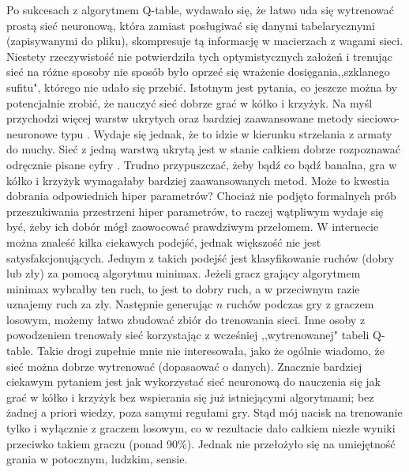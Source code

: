 \documentclass[licencjacka]{pracamgr}
\begin{document}
Po sukcesach z algorytmem Q-table, wydawało się, że łatwo uda się wytrenować prostą sieć neuronową, która zamiast posługiwać się danymi tabelarycznymi (zapisywanymi do pliku), skompresuje tą informację w macierzach z wagami sieci. Niestety rzeczywistość nie potwierdziła tych optymistycznych założeń i trenując sieć na różne sposoby nie sposób było oprzeć się wrażenie dosięgania,,szklanego sufitu", którego nie udało się przebić. Istotnym jest pytania, co jeszcze można by potencjalnie zrobić, że nauczyć sieć dobrze grać w kółko i krzyżyk.  Na myśl przychodzi więcej warstw ukrytych oraz bardziej zaawansowane metody  sieciowo-neuronowe  typu    . Wydaje się jednak, że to idzie w kierunku strzelania z armaty do muchy. Sieć z jedną warstwą ukrytą jest w stanie całkiem dobrze rozpoznawać odręcznie pisane cyfry \cite{nn}. Trudno przypuszczać, żeby bądź co bądź banalna, gra w kółko i krzyżyk wymagałaby bardziej zaawansowanych metod. Może to kwestia dobrania odpowiednich hiper parametrów? Chociaż nie podjęto formalnych  prób przeszukiwania przestrzeni hiper parametrów, to raczej wątpliwym wydaje się być, żeby ich dobór mógł zaowocować prawdziwym przełomem.  W internecie można znaleść kilka ciekawych podejść, jednak większość  nie jest satysfakcjonujących. Jednym z takich podejść jest klasyfikowanie ruchów (dobry lub zły) za pomocą algorytmu minimax. Jeżeli gracz grający algorytmem minimax wybrałby ten ruch, to jest to dobry ruch, a w przeciwnym razie uznajemy ruch za zły. Następnie generując $n$ ruchów podczas gry z graczem losowym, możemy łatwo zbudować zbiór do trenowania sieci. Inne osoby z powodzeniem trenowały sieć korzystając z wcześniej ,,wytrenowanej" tabeli Q-table.  Takie drogi zupełnie mnie nie interesowała, jako że ogólnie wiadomo, że sieć można dobrze wytrenować (dopasaować o danych). Znacznie bardziej ciekawym pytaniem jest jak wykorzystać sieć neuronową do nauczenia się  jak grać w kółko i krzyżyk bez wspierania się już istniejącymi algorytmami; bez żadnej a priori wiedzy, poza samymi regułami gry. Stąd mój nacisk na trenowanie tylko i wyłącznie z graczem losowym, co w rezultacie dało całkiem niezłe wyniki przeciwko takiem graczu (ponad 90\%).  Jednak nie przełożyło się na umiejętność grania w potocznym, ludzkim, sensie. \\
\end{document}
